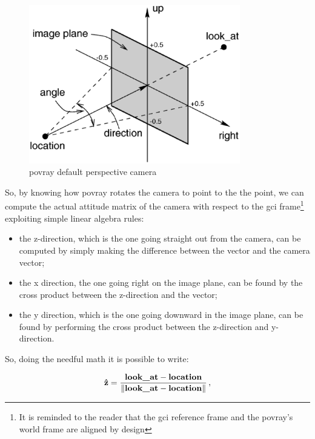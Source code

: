 \begin{figure}[htbp]
  \centering
  \includegraphics[width=0.82\textwidth]{gfx/perspcam.eps}
  \caption{\acrshort{povray} default perspective camera}
  \label{fig:perspcam}
\end{figure}

So, by knowing how \acrshort{povray} rotates the camera to point to the the  point, we can compute the actual attitude matrix of the camera with respect to the \acrshort{gci} frame\footnote{It is reminded to the reader that the \acrshort{gci} reference frame and the \acrshort{povray}'s world frame are aligned by design} exploiting simple linear algebra rules:

\begin{itemize}
  \item the z-direction, which is the one going straight out from the camera, can be computed by simply making the difference between the  vector and the camera  vector;
  \item the x direction, the one going right on the image plane, can be found by the cross product between the z-direction and the  vector;
  \item the y direction, which is the one going downward in the image plane, can be found by performing the cross product between the z-direction and y-direction.
\end{itemize}

So, doing the needful math it is possible to write:

\begin{equation}
  \mathbf{\hat{z}} = \frac{\text{\inlinecode{POV}{look_at}} - \text{\inlinecode{POV}{location}}}{\norm{\text{\inlinecode{POV}{look_at}} - \text{\inlinecode{POV}{location}}}} \,,
\end{equation}

